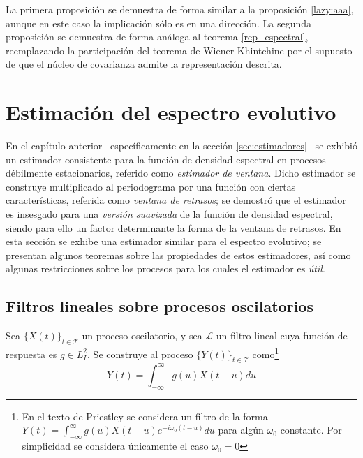 \documentclass[12pt,letterpaper]{book}
\newcommand{\intR}{\int_{-\infty}^{\infty}}
\newcommand{\xt}{$\{X(t)\}_{t\in \mathcal{T}}$ }
\newcommand{\lldos}{L^{2}_I}
\begin{document}
La primera proposición se demuestra de forma similar a la proposición \ref{lazy:aaa}, aunque en este caso la implicación sólo es en una dirección.
%
La segunda proposición se demuestra de forma análoga al teorema \ref{rep_espectral}, reemplazando la participación del teorema de Wiener-Khintchine por el supuesto de que el núcleo de covarianza admite la representación descrita.


\section{Estimación del espectro evolutivo}
\label{sec:estimacion}

En el capítulo anterior --específicamente en la sección \ref{sec:estimadores}-- se exhibió un estimador consistente para la función de densidad espectral en procesos débilmente estacionarios, referido como \textit{estimador de ventana}.
% 
Dicho estimador se construye multiplicado al periodograma por una función con ciertas características, referida como \textit{ventana de retrasos}; se demostró que el estimador es insesgado para una \textit{versión suavizada} de la función de densidad espectral, siendo para ello un factor determinante la forma de la ventana de retrasos.
%
En esta sección se exhibe una estimador similar para el espectro evolutivo; se presentan algunos teoremas sobre las propiedades de estos estimadores, así como algunas restricciones sobre los procesos para los cuales el estimador es \textit{útil}.


\subsection{Filtros lineales sobre procesos oscilatorios}

Sea \xt un proceso oscilatorio, y sea $\mathcal{L}$ un filtro lineal cuya función de respuesta es $g\in \lldos$.
Se construye al proceso $\{Y(t)\}_{t\in \mathcal{T}}$ como\footnote{En el texto de Priestley se considera un filtro de la forma $Y(t) = \intR g(u) X(t-u) e^{-i \omega_0 (t-u)} du$ para algún $\omega_0$ constante. 
%
Por simplicidad se considera únicamente el caso $\omega_0=0$}
\begin{equation}
Y(t) = \intR g(u) X(t-u) du
\end{equation}
\end{document}
